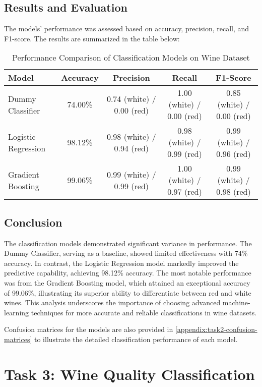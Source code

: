 \documentclass{article}
\begin{document}
    \subsection{Results and Evaluation}
    The models' performance was assessed based on accuracy, precision, recall, and F1-score. The results are summarized in the table below:

    \begin{table}[h]
        \centering
        \begin{tabular}{lcccc}
        \hline
        \textbf{Model} & \textbf{Accuracy} & \textbf{Precision} & \textbf{Recall} & \textbf{F1-Score} \\
        \hline
        Dummy Classifier     & 74.00\% & 0.74 (white) / 0.00 (red) & 1.00 (white) / 0.00 (red) & 0.85 (white) / 0.00 (red) \\
        Logistic Regression  & 98.12\% & 0.98 (white) / 0.94 (red) & 0.98 (white) / 0.99 (red) & 0.99 (white) / 0.96 (red) \\
        Gradient Boosting    & 99.06\% & 0.99 (white) / 0.99 (red) & 1.00 (white) / 0.97 (red) & 0.99 (white) / 0.98 (red) \\
        \hline
        \end{tabular}
        \caption{Performance Comparison of Classification Models on Wine Dataset}
        \label{tab:model_performance}
    \end{table}

    \subsection{Conclusion}
    The classification models demonstrated significant variance in performance. The Dummy Classifier, serving as a baseline, showed limited effectiveness with 74\% accuracy. In contrast, the Logistic Regression model markedly improved the predictive capability, achieving 98.12\% accuracy. The most notable performance was from the Gradient Boosting model, which attained an exceptional accuracy of 99.06\%, illustrating its superior ability to differentiate between red and white wines. This analysis underscores the importance of choosing advanced machine-learning techniques for more accurate and reliable classifications in wine datasets.

     Confusion matrices for the models are also provided in \ref{appendix:task2-confusion-matrices} to illustrate the detailed classification performance of each model.


\section{Task 3: Wine Quality Classification}
\end{document}
